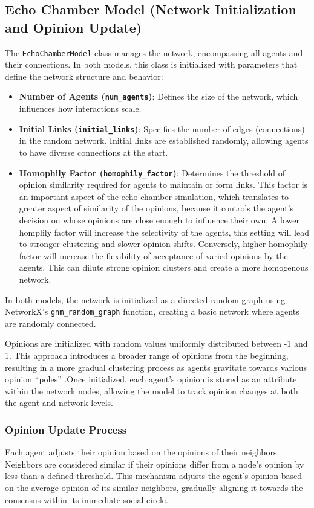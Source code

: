 \documentclass{article} %
\begin{document}
\subsection{Echo Chamber Model (Network Initialization and Opinion Update)}
The \texttt{EchoChamberModel} class manages the network, encompassing all agents and their connections. In both models, this class is initialized with parameters that define the network structure and behavior:
\begin{itemize}
    \item \textbf{Number of Agents (\texttt{num\_agents})}: Defines the size of the network, which influences how interactions scale.
    \item \textbf{Initial Links (\texttt{initial\_links})}: Specifies the number of edges (connections) in the random network. Initial links are established randomly, allowing agents to have diverse connections at the start.
    \item \textbf{Homophily Factor (\texttt{homophily\_factor})}: Determines the threshold of opinion similarity required for agents to maintain or form links.  This factor is an important aspect of the echo chamber simulation, which translates to greater aspect of similarity of the opinions, because it controls the agent's decision on whose opinions are close enough to influence their own. A lower homplily factor will increase the selectivity of the agents, this setting will lead to stronger clustering and slower opinion shifts. Conversely, higher homophily factor will increase the flexibility of acceptance of varied opinions by the agents. This can dilute strong opinion clusters and create a more homogenous network.

\end{itemize}

In both models, the network is initialized as a directed random graph using NetworkX’s \texttt{gnm\_random\_graph} function, creating a basic network where agents are randomly connected. 

Opinions are initialized with random values uniformly distributed between -1 and 1. This approach introduces a broader range of opinions from the beginning, resulting in a more gradual clustering process as agents gravitate towards various opinion “poles” .Once initialized, each agent’s opinion is stored as an attribute within the network nodes, allowing the model to track opinion changes at both the agent and network levels.

\subsubsection{Opinion Update Process}
Each agent adjusts their opinion based on the opinions of their neighbors. Neighbors are considered similar if their opinions differ from a node's opinion by less than a defined threshold. This mechanism adjusts the agent's opinion based on the average opinion of its similar neighbors, gradually aligning it towards the consensus within its immediate social circle. 
\end{document}
